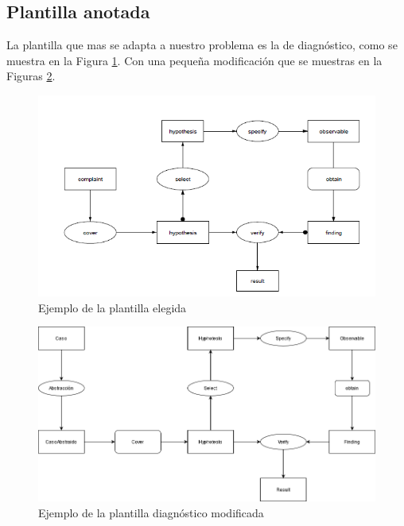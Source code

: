 \subsection{Plantilla anotada}

La plantilla que mas se adapta a nuestro problema es la de diagnóstico, como se muestra en la Figura \ref{fig:PlantillaEjemplo}. Con una pequeña modificación que se muestras en la Figuras \ref{fig:PlantillaDiagnosticoModificada}.

\begin{figure}[H]
  \centering
  \includegraphics[scale=0.90]{imagenes/PlantillaEjemplo.png}
  \caption{\label{fig:PlantillaEjemplo}Ejemplo de la plantilla elegida}
\end{figure}

\begin{figure}[H]
  \centering
  \includegraphics[scale=0.5]{imagenes/PlantillaDiagnosticoModificada.png}
  \caption{\label{fig:PlantillaDiagnosticoModificada}Ejemplo de la plantilla diagnóstico modificada}
\end{figure}

